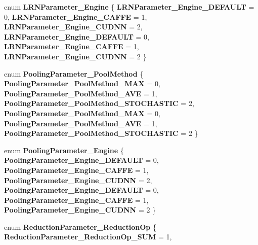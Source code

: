 \begin{DoxyCompactItemize}
\mbox{\label{namespacecaffe_a35b24282cbcf2c10881b8f246a74ca87}} 
enum {\bfseries L\+R\+N\+Parameter\+\_\+\+Engine} \{ \newline
{\bfseries L\+R\+N\+Parameter\+\_\+\+Engine\+\_\+\+D\+E\+F\+A\+U\+LT} = 0, 
{\bfseries L\+R\+N\+Parameter\+\_\+\+Engine\+\_\+\+C\+A\+F\+FE} = 1, 
{\bfseries L\+R\+N\+Parameter\+\_\+\+Engine\+\_\+\+C\+U\+D\+NN} = 2, 
{\bfseries L\+R\+N\+Parameter\+\_\+\+Engine\+\_\+\+D\+E\+F\+A\+U\+LT} = 0, 
\newline
{\bfseries L\+R\+N\+Parameter\+\_\+\+Engine\+\_\+\+C\+A\+F\+FE} = 1, 
{\bfseries L\+R\+N\+Parameter\+\_\+\+Engine\+\_\+\+C\+U\+D\+NN} = 2
 \}
\item 
\mbox{\label{namespacecaffe_a41737a31f35a993565575ca16671a9d7}} 
enum {\bfseries Pooling\+Parameter\+\_\+\+Pool\+Method} \{ \newline
{\bfseries Pooling\+Parameter\+\_\+\+Pool\+Method\+\_\+\+M\+AX} = 0, 
{\bfseries Pooling\+Parameter\+\_\+\+Pool\+Method\+\_\+\+A\+VE} = 1, 
{\bfseries Pooling\+Parameter\+\_\+\+Pool\+Method\+\_\+\+S\+T\+O\+C\+H\+A\+S\+T\+IC} = 2, 
{\bfseries Pooling\+Parameter\+\_\+\+Pool\+Method\+\_\+\+M\+AX} = 0, 
\newline
{\bfseries Pooling\+Parameter\+\_\+\+Pool\+Method\+\_\+\+A\+VE} = 1, 
{\bfseries Pooling\+Parameter\+\_\+\+Pool\+Method\+\_\+\+S\+T\+O\+C\+H\+A\+S\+T\+IC} = 2
 \}
\item 
\mbox{\label{namespacecaffe_ae961d14813c949ad9e888ef13b18aa22}} 
enum {\bfseries Pooling\+Parameter\+\_\+\+Engine} \{ \newline
{\bfseries Pooling\+Parameter\+\_\+\+Engine\+\_\+\+D\+E\+F\+A\+U\+LT} = 0, 
{\bfseries Pooling\+Parameter\+\_\+\+Engine\+\_\+\+C\+A\+F\+FE} = 1, 
{\bfseries Pooling\+Parameter\+\_\+\+Engine\+\_\+\+C\+U\+D\+NN} = 2, 
{\bfseries Pooling\+Parameter\+\_\+\+Engine\+\_\+\+D\+E\+F\+A\+U\+LT} = 0, 
\newline
{\bfseries Pooling\+Parameter\+\_\+\+Engine\+\_\+\+C\+A\+F\+FE} = 1, 
{\bfseries Pooling\+Parameter\+\_\+\+Engine\+\_\+\+C\+U\+D\+NN} = 2
 \}
\item 
\mbox{\label{namespacecaffe_a1560a2b6065051352fb8f3db1f02243e}} 
enum {\bfseries Reduction\+Parameter\+\_\+\+Reduction\+Op} \{ \newline
{\bfseries Reduction\+Parameter\+\_\+\+Reduction\+Op\+\_\+\+S\+UM} = 1, 

\end{DoxyCompactItemize}
